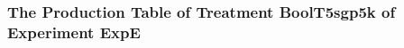  \begin{frame}
 \fontsize{8pt}{9pt}\selectfont
 \frametitle{ The Production Table of Treatment BoolT5sgp5k of Experiment ExpE }

 \label{ExpEGrammarTable012.tex}  
 \end{frame}

